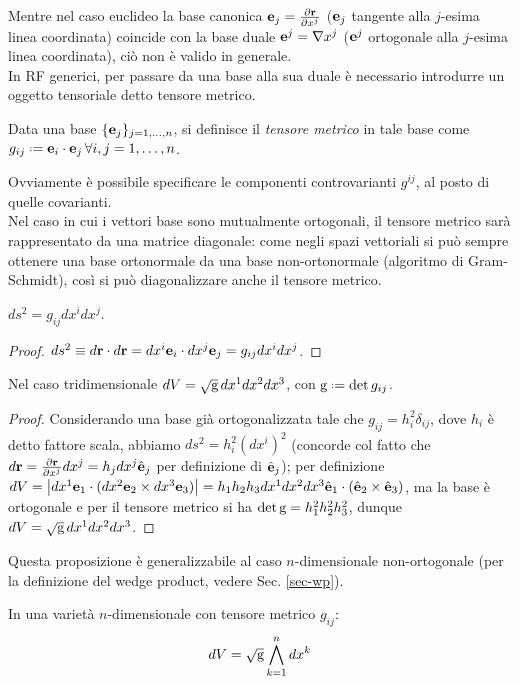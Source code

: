 Mentre nel caso euclideo la base canonica $ \mathbf{e}_j = \frac{\partial \mathbf{r}}{\partial x^j} $ ($ \mathbf{e}_j $ tangente alla $ j $-esima linea coordinata) coincide con la base duale $ \mathbf{e}^j = \nabla x^j $ ($ \mathbf{e}^j $ ortogonale alla $ j $-esima linea coordinata), ciò non è valido in generale.\\
In RF generici, per passare da una base alla sua duale è necessario introdurre un oggetto tensoriale detto tensore metrico.

\begin{definition}
	Data una base $ \{\mathbf{e}_j\}_{j=1,\dots,n} $, si definisce il \textit{tensore metrico} in tale base come $ g_{ij} \defeq \ve{e}_i \cdot \ve{e}_j \, \forall i,j = 1,\dots,n$.
\end{definition}

Ovviamente è possibile specificare le componenti controvarianti $ g^{ij} $, al posto di quelle covarianti. \\
Nel caso in cui i vettori base sono mutualmente ortogonali, il tensore metrico sarà rappresentato da una matrice diagonale: come negli spazi vettoriali si può sempre ottenere una base ortonormale da una base non-ortonormale (algoritmo di Gram-Schmidt), così si può diagonalizzare anche il tensore metrico.

\begin{proposition}
	$ ds^2 = g_{ij} dx^i dx^j $.
\end{proposition}
\begin{proof}
	$ ds^2 \equiv d\mathbf{r} \cdot d\mathbf{r} = dx^i \mathbf{e}_i \cdot dx^j \mathbf{e}_j = g_{ij} dx^i dx^j $.
\end{proof}

\begin{proposition}
	Nel caso tridimensionale $ dV = \sqrt{\mathbf{\text{g}}}\, dx^1 dx^2 dx^3 $, con $ \tens{g} \defeq \det g_{ij} $.
\end{proposition}
\begin{proof}
	Considerando una base già ortogonalizzata tale che $ g_{ij} = h_i^2 \delta_{ij} $, dove $ h_i $ è detto fattore scala, abbiamo $ ds^2 = h_i^2 (dx^i)^2 $ (concorde col fatto che $ d\mathbf{r} = \frac{\partial \mathbf{r}}{\partial x^j} dx^j = h_j dx^j \hat{\mathbf{e}}_j $ per definizione di $ \hat{\mathbf{e}}_j $); per definizione $ dV = \left\lvert dx^1\mathbf{e}_1 \cdot (dx^2\mathbf{e}_2 \times dx^3\mathbf{e}_3)\right\rvert = h_1 h_2 h_3 dx^1 dx^2 dx^3 \hat{\mathbf{e}}_1 \cdot (\hat{\mathbf{e}}_2 \times \hat{\mathbf{e}}_3) $, ma la base è ortogonale e per il tensore metrico si ha $ \det\mathbf{\text{g}} = h_1^2 h_2^2 h_3^2 $, dunque $ dV = \sqrt{\mathbf{\text{g}}}\, dx^1 dx^2 dx^3 $.
\end{proof}
Questa proposizione è generalizzabile al caso $ n $-dimensionale non-ortogonale (per la definizione del wedge product, vedere Sec. \ref{sec-wp}).
\begin{proposition}
	In una varietà $ n $-dimensionale con tensore metrico $ g_{ij} $:
	\begin{equation}
		dV = \sqrt{\mathbf{\text{g}}} \displaystyle\bigwedge_{k = 1}^n dx^k
	\end{equation}
\end{proposition}

